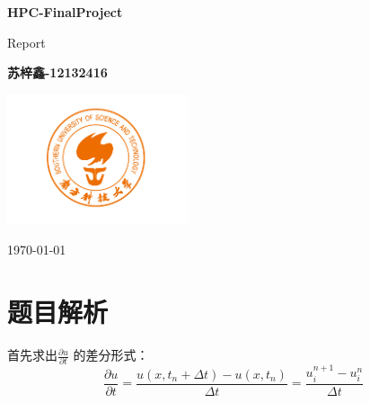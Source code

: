 \documentclass[10pt, a4paper]{article}
\begin{document}
\begin{titlepage}
    \begin{center}
        \vspace*{3cm}
            
        \Huge
        \textbf{HPC-FinalProject}
            
        \vspace{1cm}
        \huge
        Report
            
        \vspace{1.5cm}
        \Large
            
        \textbf{苏梓鑫-12132416}                      %
        
            
        \vfill
        
        
            
        \vspace{1cm}
            
        \includegraphics[width=0.4\textwidth]{img/logo-sustech.png}
        \\
        
        \Large
        
        \today
            
    \end{center}
\end{titlepage}


\clearpage  
\phantom{s}  
\thispagestyle{empty} 
\clearpage
\section{题目解析}
首先求出$\frac{\partial{u}}{\partial t}$ 的差分形式：
$$\frac{\partial u}{\partial t}=\frac{u(x,t_n+\Delta t)-u(x,t_n)}{\Delta t}=\frac{u^{n+1}_{i}-u^{n}_{i}}{\Delta t}$$
\end{document}
